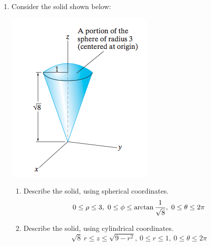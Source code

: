 \documentclass{hw}
\begin{document}
\begin{enumerate}
\item Consider the solid shown below:
\begin{center}
\includegraphics[scale=0.4]{hw6_pic}
\end{center}
\begin{enumerate}
\item Describe the solid, using spherical coordinates.
\[
0\leq\rho\leq3,\ 0\leq\phi\leq\arctan{1\over\sqrt{8}},\ 0\leq\theta\leq2\pi
\]
\item Describe the solid, using cylindrical coordinates.
\[
\sqrt{8}\ r\leq z\leq\sqrt{9-r^{2}},\ 0\leq r\leq 1,\ 0\leq\theta\leq2\pi
\]
\end{enumerate}
\end{enumerate}
\end{document}

